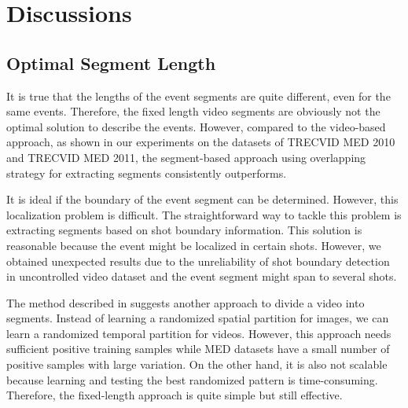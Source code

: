 \section{Discussions}
\label{discussion}
\subsection{Optimal Segment Length} 
It is true that the lengths of the event segments are quite different, even for the same events. Therefore, the fixed length video segments are obviously not the optimal solution to describe the events. However, compared to the video-based approach, as shown in our experiments on the datasets of TRECVID MED 2010 and TRECVID MED 2011, the segment-based approach using overlapping strategy for extracting segments consistently outperforms.

It is ideal if the boundary of the event segment can be determined. However, this localization problem is difficult. The straightforward way to tackle this problem is extracting segments based on shot boundary information. This solution is reasonable because the event might be localized in certain shots. However, we obtained unexpected results due to the unreliability of shot boundary detection in uncontrolled video dataset and the event segment might span to several shots.

The method described in \cite{DBLP:conf/eccv/JiangYY12} suggests another approach to divide a video into segments. Instead of learning a randomized spatial partition for images, we can learn a randomized temporal partition for videos. However, this approach needs sufficient positive training samples while MED datasets have a small number of positive samples with large variation. On the other hand, it is also not scalable because learning and testing the best randomized pattern is time-consuming. Therefore, the fixed-length approach is quite simple but still effective.

